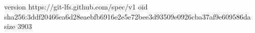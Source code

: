 version https://git-lfs.github.com/spec/v1
oid sha256:3ddf20466ea6d28eaebfb6916e2e5e72bee3d93509e0926cba37af9e609586da
size 3903
